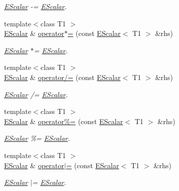 \begin{DoxyCompactItemize}
\begin{DoxyCompactList}\small\item\em \mbox{\hyperlink{classENSEM_1_1EScalar}{E\+Scalar}} -\/= \mbox{\hyperlink{classENSEM_1_1EScalar}{E\+Scalar}}. \end{DoxyCompactList}\item 
{\footnotesize template$<$class T1 $>$ }\\\mbox{\hyperlink{classENSEM_1_1EScalar}{E\+Scalar}} \& \mbox{\hyperlink{classENSEM_1_1EScalar_aa614bef8258a8ea3c2711c4d7d032c1a}{operator$\ast$=}} (const \mbox{\hyperlink{classENSEM_1_1EScalar}{E\+Scalar}}$<$ T1 $>$ \&rhs)
\begin{DoxyCompactList}\small\item\em \mbox{\hyperlink{classENSEM_1_1EScalar}{E\+Scalar}} $\ast$= \mbox{\hyperlink{classENSEM_1_1EScalar}{E\+Scalar}}. \end{DoxyCompactList}\item 
{\footnotesize template$<$class T1 $>$ }\\\mbox{\hyperlink{classENSEM_1_1EScalar}{E\+Scalar}} \& \mbox{\hyperlink{classENSEM_1_1EScalar_a09524cf0f6f5baf9c421d03df58fe8d6}{operator/=}} (const \mbox{\hyperlink{classENSEM_1_1EScalar}{E\+Scalar}}$<$ T1 $>$ \&rhs)
\begin{DoxyCompactList}\small\item\em \mbox{\hyperlink{classENSEM_1_1EScalar}{E\+Scalar}} /= \mbox{\hyperlink{classENSEM_1_1EScalar}{E\+Scalar}}. \end{DoxyCompactList}\item 
{\footnotesize template$<$class T1 $>$ }\\\mbox{\hyperlink{classENSEM_1_1EScalar}{E\+Scalar}} \& \mbox{\hyperlink{classENSEM_1_1EScalar_ab4bd572c2f331fadf6914f406bce991f}{operator\%=}} (const \mbox{\hyperlink{classENSEM_1_1EScalar}{E\+Scalar}}$<$ T1 $>$ \&rhs)
\begin{DoxyCompactList}\small\item\em \mbox{\hyperlink{classENSEM_1_1EScalar}{E\+Scalar}} \%= \mbox{\hyperlink{classENSEM_1_1EScalar}{E\+Scalar}}. \end{DoxyCompactList}\item 
{\footnotesize template$<$class T1 $>$ }\\\mbox{\hyperlink{classENSEM_1_1EScalar}{E\+Scalar}} \& \mbox{\hyperlink{classENSEM_1_1EScalar_a95469ba3db6456ae2fa0c6d86d082c0a}{operator$\vert$=}} (const \mbox{\hyperlink{classENSEM_1_1EScalar}{E\+Scalar}}$<$ T1 $>$ \&rhs)
\begin{DoxyCompactList}\small\item\em \mbox{\hyperlink{classENSEM_1_1EScalar}{E\+Scalar}} $\vert$= \mbox{\hyperlink{classENSEM_1_1EScalar}{E\+Scalar}}. \end{DoxyCompactList}\item 

\end{DoxyCompactItemize}
